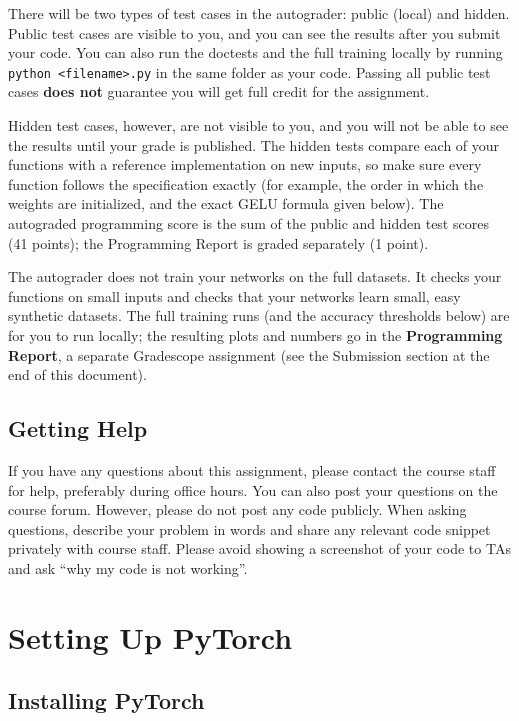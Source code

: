 \documentclass[11pt]{exam}
\begin{document}
There will be two types of test cases in the autograder: public (local) and hidden. Public test cases are visible to you, and you can see the results after you submit your code. You can also run the doctests and the full training locally by running \verb|python <filename>.py| in the same folder as your code. Passing all public test cases \textbf{does not} guarantee you will get full credit for the assignment.

Hidden test cases, however, are not visible to you, and you will not be able to see the results until
your grade is published. The hidden tests compare each of your functions with a reference implementation on new inputs, so make sure every function follows the specification exactly (for example, the order in which the weights are initialized, and the exact GELU formula given below). The autograded programming score is the sum of the public and hidden test scores (41 points); the Programming Report is graded separately (1 point).

The autograder does not train your networks on the full datasets. It checks your functions on small inputs and checks that your networks learn small, easy synthetic datasets. The full training runs (and the accuracy thresholds below) are for you to run locally; the resulting plots and numbers go in the \textbf{Programming Report}, a separate Gradescope assignment (see the Submission section at the end of this document).

\subsection*{Getting Help}
If you have any questions about this assignment, please contact the course staff for help, preferably during office hours. You can also post your questions on the course forum. However, please do not post any code publicly. When asking questions, describe your problem in words and share any relevant code snippet privately with course staff. Please avoid showing a screenshot of your code to TAs and ask ``why my code is not working''.

\section*{Setting Up PyTorch}

\subsection*{Installing PyTorch}
\end{document}
